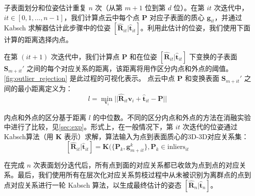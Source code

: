 子表面划分和位姿估计重复 $n$ 次（从第 $m + 1$ 位到第 $d$ 位）。在第 $it$ 次迭代中，$it \in [0,1,...,n-1]$，我们计算点云中每个点 $\mathbf{P}$ 对应子表面的质心 $\mathbf{g}_{it}$，并通过 Kabsch 求解器估计此步骤中的位姿 $[\hat{\mathbf{R}}_{it}|\hat{\mathbf{t}}_{it}]$。利用此估计的位姿，我们使用下面计算的距离选择内点。

在第 $(it+1)$ 次迭代中，我们计算点 $\mathbf{P}$ 和在位姿 $[\hat{\mathbf{R}}_{it}|\hat{\mathbf{t}}_{it}]$ 下变换的子表面 $\mathbf{S}_{m+it}'$ 之间的每个对应关系的距离，该距离将用作区分内点和外点的阈值。\autoref{fig:outlier_rejection} 是此过程的可视化表示。
点云中点 $\mathbf{P}$ 和变换表面 $\mathbf{S}_{m+it}'$ 之间的最小距离定义为：
\begin{equation}
\label{eq:l}
l = \min\limits_{\mathbf{v}_i} ||\hat{\mathbf{R}}_{it} \mathbf{v}_{i} + \hat{\mathbf{t}}_{it}-\mathbf{P}||
\end{equation}

内点和外点的区分基于距离 $l$ 的中位数。不同的区分内点和外点的方法在消融实验中进行了比较，见\autoref{sec:exp}。形式上，在一般情况下，第 $it$ 次迭代的位姿通过 Kabsch算法（用 $\mathbf{K}$ 表示）求解，算法输入为点到表面质心的3D-3D对应关系集：
\begin{equation}
    \label{eq:posekabsch}
    [\hat{\mathbf{R}}_{it}|\hat{\mathbf{t}}_{it}] = \mathbf{K}(\{\mathbf{P}_{k}, \mathbf{g}_{m+it}^{k}\}, {\mathbf{P}_{k}\in \text{inliers}_{it}}
\end{equation}

在完成 $n$ 次表面划分迭代后，所有点到面的对应关系都已收敛为点到点的对应关系。最后，我们使用所有在层次化对应关系剪枝过程中从未被识别为离群点的点到点对应关系进行一轮 Kabsch 算法，以生成最终估计的姿态 $[\hat{\mathbf{R}}_{n}|\hat{\mathbf{t}}_{n}]$。
